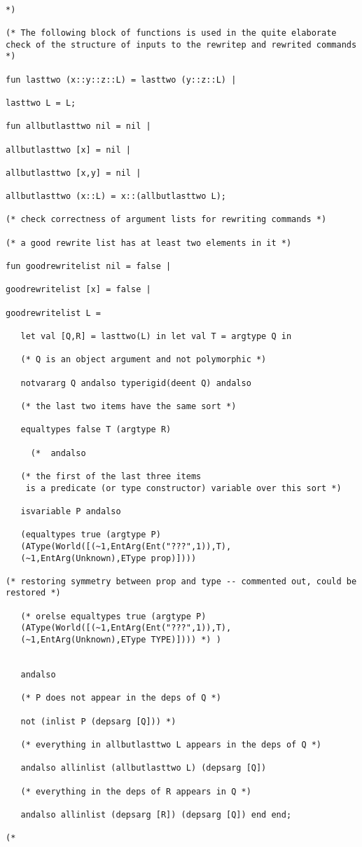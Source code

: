 \documentclass{article}
\begin{document}
\begin{verbatim}

*)

(* The following block of functions is used in the quite elaborate
check of the structure of inputs to the rewritep and rewrited commands *)

fun lasttwo (x::y::z::L) = lasttwo (y::z::L) |

lasttwo L = L;

fun allbutlasttwo nil = nil |

allbutlasttwo [x] = nil |

allbutlasttwo [x,y] = nil |

allbutlasttwo (x::L) = x::(allbutlasttwo L);

(* check correctness of argument lists for rewriting commands *)

(* a good rewrite list has at least two elements in it *)

fun goodrewritelist nil = false |

goodrewritelist [x] = false |

goodrewritelist L = 

   let val [Q,R] = lasttwo(L) in let val T = argtype Q in

   (* Q is an object argument and not polymorphic *)

   notvararg Q andalso typerigid(deent Q) andalso

   (* the last two items have the same sort *)

   equaltypes false T (argtype R) 

     (*  andalso

   (* the first of the last three items 
    is a predicate (or type constructor) variable over this sort *)

   isvariable P andalso

   (equaltypes true (argtype P) 
   (AType(World([(~1,EntArg(Ent("???",1)),T),
   (~1,EntArg(Unknown),EType prop)])))

(* restoring symmetry between prop and type -- commented out, could be restored *)

   (* orelse equaltypes true (argtype P) 
   (AType(World([(~1,EntArg(Ent("???",1)),T),
   (~1,EntArg(Unknown),EType TYPE)]))) *) )


   andalso

   (* P does not appear in the deps of Q *)

   not (inlist P (depsarg [Q])) *)

   (* everything in allbutlasttwo L appears in the deps of Q *)

   andalso allinlist (allbutlasttwo L) (depsarg [Q])

   (* everything in the deps of R appears in Q *)

   andalso allinlist (depsarg [R]) (depsarg [Q]) end end;

(*

\end{verbatim}
\end{document}
